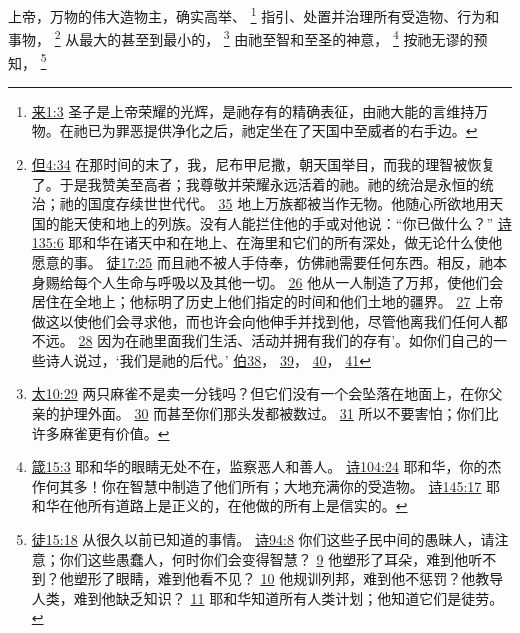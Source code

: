 \documentclass[12pt, a4paper, oneside]{ctexart}
\newcounter{parnum}[section]
\newcommand{\N}{%
   \noindent\refstepcounter{parnum}%
    \makebox[\parindent][l]{\textbf{\arabic{parnum}.}}}
\begin{document}
\N 上帝，万物的伟大造物主，确实高举、
	\footnote {
		\href{https://biblehub.com/hebrews/1-3.htm}{来1:3} 圣子是上帝荣耀的光辉，是祂存有的精确表征，由祂大能的言维持万物。在祂已为罪恶提供净化之后，祂定坐在了天国中至威者的右手边。
	}
	指引、处置并治理所有受造物、行为和事物，
	\footnote {
		\href{https://biblehub.com/daniel/4-34.htm}{但4:34} 在那时间的末了，我，尼布甲尼撒，朝天国举目，而我的理智被恢复了。于是我赞美至高者；我尊敬并荣耀永远活着的祂。祂的统治是永恒的统治；祂的国度存续世世代代。
		\href{https://biblehub.com/daniel/4-35.htm}{35} 地上万族都被当作无物。他随心所欲地用天国的能天使和地上的列族。没有人能拦住他的手或对他说：“你已做什么？”
		\href{https://biblehub.com/psalms/135-6.htm}{诗135:6} 耶和华在诸天中和在地上、在海里和它们的所有深处，做无论什么使他愿意的事。
		\href{https://biblehub.com/acts/17-25.htm}{徒17:25} 而且祂不被人手侍奉，仿佛祂需要任何东西。相反，祂本身赐给每个人生命与呼吸以及其他一切。
		\href{https://biblehub.com/acts/17-26.htm}{26} 他从一人制造了万邦，使他们会居住在全地上；他标明了历史上他们指定的时间和他们土地的疆界。
		\href{https://biblehub.com/acts/17-27.htm}{27} 上帝做这以使他们会寻求他，而也许会向他伸手并找到他，尽管他离我们任何人都不远。
		\href{https://biblehub.com/acts/17-28.htm}{28} 因为在祂里面我们生活、活动并拥有我们的存有’。如你们自己的一些诗人说过，‘我们是祂的后代。’
		\href{https://biblehub.com/niv/job/38.htm}{伯38}，
		\href{https://biblehub.com/niv/job/39.htm}{39}，
		\href{https://biblehub.com/niv/job/40.htm}{40}，
		\href{https://biblehub.com/niv/job/41.htm}{41}
	}
	从最大的甚至到最小的，
	\footnote {
		\href{https://biblehub.com/matthew/10-29.htm}{太10:29} 两只麻雀不是卖一分钱吗？但它们没有一个会坠落在地面上，在你父亲的护理外面。
		\href{https://biblehub.com/matthew/10-30.htm}{30} 而甚至你们那头发都被数过。
		\href{https://biblehub.com/matthew/10-31.htm}{31} 所以不要害怕；你们比许多麻雀更有价值。
	}
	由祂至智和至圣的神意，
	\footnote {
		\href{https://biblehub.com/proverbs/15-3.htm}{箴15:3} 耶和华的眼睛无处不在，监察恶人和善人。
		\href{https://biblehub.com/psalms/104-24.htm}{诗104:24} 耶和华，你的杰作何其多！你在智慧中制造了他们所有；大地充满你的受造物。
		\href{https://biblehub.com/psalms/145-17.htm}{诗145:17} 耶和华在他所有道路上是正义的，在他做的所有上是信实的。
	}
	按祂无谬的预知，
	\footnote {
		\href{https://biblehub.com/acts/15-18.htm}{徒15:18} 从很久以前已知道的事情。
		\href{https://biblehub.com/psalms/94-8.htm}{诗94:8} 你们这些子民中间的愚昧人，请注意；你们这些愚蠢人，何时你们会变得智慧？
		\href{https://biblehub.com/psalms/94-9.htm}{9} 他塑形了耳朵，难到他听不到？他塑形了眼睛，难到他看不见？
		\href{https://biblehub.com/psalms/94-10.htm}{10} 他规训列邦，难到他不惩罚？他教导人类，难到他缺乏知识？
		\href{https://biblehub.com/psalms/94-11.htm}{11} 耶和华知道所有人类计划；他知道它们是徒劳。
	}
\end{document}
